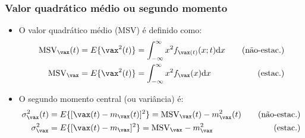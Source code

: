 \begin{frame}
    \frametitle{Valor quadrático médio ou segundo momento}

    \begin{itemize}
     \item O valor quadrático médio (MSV) é definido como:
      \begin{align*}
	  \mathrm{MSV}_{\vax}(t) &= E\{\vax^2(t)\} = \int_{-\infty}^{\infty} x^2 f_{\vax(t)}(x;t)\mathrm{d}x \quad &\textrm{(não-estac.)} \\
	  \mathrm{MSV}_{\vax} &= E\{\vax^2(t)\} = \int_{-\infty}^{\infty} x^2 f_{\vax}(x)\mathrm{d}x \quad &\textrm{(estac.)}
      \end{align*}
      \item O segundo momento central (ou variância) é:
      \begin{align*}
	  \sigma_{\vax}^2(t) &= E\{[\vax(t) - m_{\vax}(t)]^2\} = \mathrm{MSV}_{\vax}(t)  - m_{\vax}^2(t) \quad &\textrm{(não-estac.)} \\
	  \sigma_{\vax}^2 &= E\{[\vax(t) - m_{\vax}]^2\} = \mathrm{MSV}_{\vax}  - m_{\vax}^2 \quad &\textrm{(estac.)}
      \end{align*}

    \end{itemize}
     
\end{frame}

